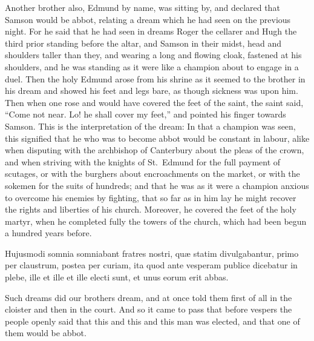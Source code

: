 \documentclass{book}
\begin{document}
\begin{paracol}{2}
\switchcolumn

Another brother also, Edmund by name, was sitting by, and declared that Samson would be abbot, relating a dream which he had seen on the previous night. For he said that he had seen in dreams Roger the cellarer and Hugh the third prior standing before the altar, and Samson in their midst, head and shoulders taller than they, and wearing a long and flowing cloak, fastened at his shoulders, and he was standing as it were like a champion about to engage in a duel. Then the holy Edmund arose from his shrine ­as it seemed to the brother in his dream ­and showed his feet and legs bare, as though sickness was upon him. Then when one rose and would have covered the feet of the saint, the saint said, ``Come not near. Lo! he shall cover my feet,'' and pointed his finger towards Samson. This is the interpretation of the dream: In that a champion was seen, this signified that he who was to become abbot would be constant in labour, alike when disputing with the archbishop of Canterbury about the pleas of the crown, and when striving with the knights of St.\ Edmund for the full payment of scutages, or with the burghers about encroachments on the market, or with the sokemen for the suits of hundreds; and that he was as it were a champion anxious to overcome his enemies by fighting, that so far as in him lay he might recover the rights and liberties of his church. Moreover, he covered the feet of the holy martyr, when he completed fully the towers of the church, which had been begun a hundred years before.

\switchcolumn*

\begin{otherlanguage}{latin}
Hujusmodi somnia somniabant fratres nostri, qu\ae{} statim divulgabantur, primo per claustrum, postea per curiam, ita quod ante vesperam publice dicebatur in plebe, ille et ille et ille electi sunt, et unus eorum erit abbas.
\end{otherlanguage}

\switchcolumn

Such dreams did our brothers dream, and at once told them first of all in the cloister and then in the court. And so it came to pass that before vespers the people openly said that this and this and this man was elected, and that one of them would be abbot.

\switchcolumn*


\end{paracol}
\end{document}
